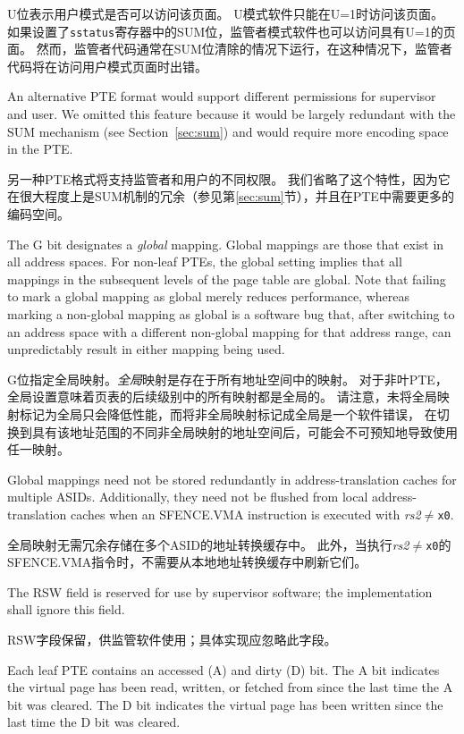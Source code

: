 U位表示用户模式是否可以访问该页面。
U模式软件只能在U=1时访问该页面。
如果设置了{\tt sstatus}寄存器中的SUM位，监管者模式软件也可以访问具有U=1的页面。
然而，监管者代码通常在SUM位清除的情况下运行，在这种情况下，监管者代码将在访问用户模式页面时出错。

\begin{commentary}
An alternative PTE format would support different permissions for supervisor
and user.  We omitted this feature because it would be largely redundant with
the SUM mechanism (see Section~\ref{sec:sum}) and would require more encoding
space in the PTE.

另一种PTE格式将支持监管者和用户的不同权限。
我们省略了这个特性，因为它在很大程度上是SUM机制的冗余（参见第\ref{sec:sum}节），并且在PTE中需要更多的编码空间。
\end{commentary}

The G bit designates a {\em global} mapping.  Global mappings are those that
exist in all address spaces.  For non-leaf PTEs, the global setting implies
that all mappings in the subsequent levels of the page table are global.  Note
that failing to mark a global mapping as global merely reduces performance,
whereas marking a non-global mapping as global is a software bug that,
after switching to an address space with a different non-global mapping for
that address range, can unpredictably result in either mapping being used.

G位指定全局映射。{\em 全局}映射是存在于所有地址空间中的映射。
对于非叶PTE，全局设置意味着页表的后续级别中的所有映射都是全局的。
请注意，未将全局映射标记为全局只会降低性能，而将非全局映射标记成全局是一个软件错误，
在切换到具有该地址范围的不同非全局映射的地址空间后，可能会不可预知地导致使用任一映射。

\begin{commentary}
Global mappings need not be stored redundantly in address-translation caches
for multiple ASIDs.  Additionally, they need not be flushed from local
address-translation caches when an SFENCE.VMA instruction is executed with
{\em rs2}$\neq${\tt x0}.

全局映射无需冗余存储在多个ASID的地址转换缓存中。
此外，当执行{\em rs2}$\neq${\tt x0}的SFENCE.VMA指令时，不需要从本地地址转换缓存中刷新它们。
\end{commentary}
The RSW field is reserved for use by supervisor software; the implementation
shall ignore this field.

RSW字段保留，供监管软件使用；具体实现应忽略此字段。

Each leaf PTE contains an accessed (A) and dirty (D) bit.  The A bit indicates
the virtual page has been read, written, or fetched from since the last time
the A bit was cleared.  The D bit indicates the virtual page has been written
since the last time the D bit was cleared.

